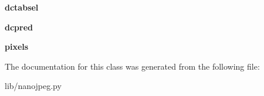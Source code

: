 \begin{DoxyCompactItemize}
{\bfseries dctabsel}
\item 
\mbox{\label{class_python_01_g_u_i_1_1lib_1_1nanojpeg_1_1nj__component__t_a249498c6115fd1d0cbad270af10b1f6c}} 
{\bfseries dcpred}
\item 
\mbox{\label{class_python_01_g_u_i_1_1lib_1_1nanojpeg_1_1nj__component__t_a367ce66ec7ceb086dab90bcd0110ff50}} 
{\bfseries pixels}
\end{DoxyCompactItemize}


The documentation for this class was generated from the following file\+:\begin{DoxyCompactItemize}
\item 
lib/nanojpeg.\+py\end{DoxyCompactItemize}
